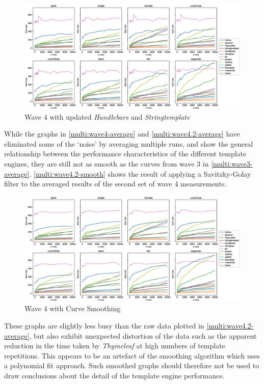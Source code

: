 \begin{figure}[ht!]
\centering
\includegraphics[width=\columnwidth]{Figures/graphs/wave4/2023-12-20avg.eps}
\caption{\label{multi:wave4.2-average}Wave 4 with updated \emph{Handlebars} and \emph{Stringtemplate}}
\end{figure}

While the graphs in \autoref{multi:wave4-average} and \autoref{multi:wave4.2-average} have eliminated some of the `noise' by averaging multiple runs, and show the general relationship between the performance characteristics of the different template engines, they are still not as smooth as the curves from wave 3 in \autoref{multi:wave3-average}. \autoref{multi:wave4.2-smooth} shows the result of applying a Savitzky-Golay filter \citep{Schafer2011} to the averaged results of the second set of wave 4 measurements.

\begin{figure}[ht!]
\centering
\includegraphics[width=\columnwidth]{Figures/graphs/wave4/wave4-smooth.eps}
\caption{\label{multi:wave4.2-smooth}Wave 4 with Curve Smoothing}
\end{figure}

These graphs are slightly less busy than the raw data plotted in \autoref{multi:wave4.2-average}, but also exhibit unexpected distortion of the data such as the apparent reduction in the time taken by \emph{Thymeleaf} at high numbers of template repetitions. This appears to be an artefact of the smoothing algorithm which uses a polynomial fit approach. Such smoothed graphs should therefore not be used to draw conclusions about the detail of the template engine performance.

